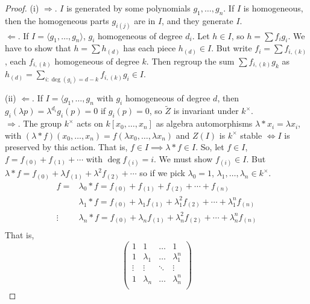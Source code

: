 \documentclass{article}
\begin{document}
\begin{proof}
    (i) $\Rightarrow$. $I$ is generated by some polynomials $g_1, \dotsc, g_n$. If $I$ is homogeneous, then the homogeneous parts $g_{i(j)}$ are in $I$, and they generate $I$. \\
    $\Leftarrow$. If $I = \langle g_1, \dotsc, g_n \rangle$, $g_i$ homogeneous of degree $d_i$.
    Let $h \in I$, so $h = \sum f_i g_i$.
    We have to show that $h = \sum h_{(d)}$ has each piece $h_{(d)} \in I$.
    But write $f_i = \sum f_{i,(k)}$, each $f_{i,(k)}$ homogeneous of degree $k$.
    Then regroup the sum $\sum f_{i, (k)} g_k$ as $h_{(d)} = \sum_{i : \deg(g_i) = d-k} f_{i, (k)} g_i \in I$.

    (ii) $\Leftarrow$. If $I = \langle g_1, \dotsc, g_n$ with $g_i$ homogeneous of degree $d$, then $g_i (\lambda p) = \lambda^{d_i} g_i(p) = 0$ if $g_i(p) = 0$, so $\tilde{Z}$ is invariant under $k^\times$. \\
    $\Rightarrow$. The group $k^\times$ acts on $k[x_0, \dotsc, x_n]$ as algebra automorphisms $\lambda * x_i = \lambda x_i$, with $(\lambda * f) (x_0, \dotsc, x_n) = f(\lambda x_0, \dotsc, \lambda x_n)$ and $Z(I)$ is $k^\times$ stable $\iff I$ is preserved by this action.
    That is, $f \in I \implies \lambda * f \in I$.
    So, let $f \in I$, $f = f_{(0)} + f_{(1)} + \dotsb$ with $\deg f_{(i)}  = i$. We must show $f_{(i)} \in I$.
    But $\lambda * f = f_{(0)} + \lambda f_{(1)} + \lambda^2 f_{(2)} + \dotsb$ so if we pick $\lambda_0 = 1$, $\lambda_1, \dotsc, \lambda_n \in k^\times$.
    \begin{align*}
        f = &\lambda_0 * f = f_{(0)} + f_{(1)} + f_{(2)} + \dotsb + f_{(n)} \\
            &\lambda_1 * f = f_{(0)} + \lambda_1 f_{(1)} + \lambda_1^2 f_{(2)} + \dotsb + \lambda_1^n f_{(n)} \\
        \vdots
            &\lambda_n * f = f_{(0)} + \lambda_n f_{(1)} + \lambda_n^2 f_{(2)} + \dotsb + \lambda_n^n f_{(n)} \\
    \end{align*}
    That is,
    \begin{equation*}
        \begin{pmatrix}
            1 & 1 & \dots & 1 \\
            1 & \lambda_1 & \dots & \lambda_1^n \\
            \vdots & \vdots & \ddots & \vdots \\
            1 & \lambda_n & \dots & \lambda_n^n \\

\end{pmatrix}
\end{equation*}
\end{proof}
\end{document}
